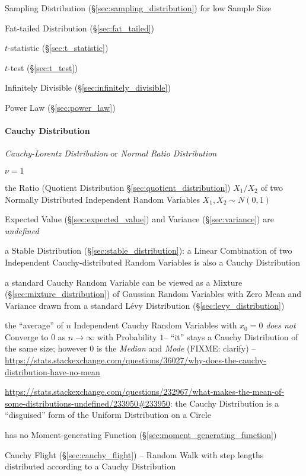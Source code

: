 Sampling Distribution (\S\ref{sec:sampling_distribution}) for low Sample Size

Fat-tailed Distribution (\S\ref{sec:fat_tailed})

$t$-statistic (\S\ref{sec:t_statistic})

$t$-test (\S\ref{sec:t_test})

Infinitely Divisible (\S\ref{sec:infinitely_divisible})

Power Law (\S\ref{sec:power_law})



\paragraph{Cauchy Distribution}\label{sec:cauchy_distribution}\hfill

\emph{Cauchy-Lorentz Distribution} or \emph{Normal Ratio Distribution}

$\nu = 1$

the Ratio (Quotient Distribution \S\ref{sec:quotient_distribution}) $X_1/X_2$ of
two Normally Distributed Independent Random Variables $X_1, X_2 \sim N(0,1)$

Expected Value (\S\ref{sec:expected_value}) and Variance (\S\ref{sec:variance})
are \emph{undefined}

a Stable Distribution (\S\ref{sec:stable_distribution}): a Linear Combination of
two Independent Cauchy-distributed Random Variables is also a Cauchy
Distribution

a standard Cauchy Random Variable can be viewed as a Mixture
(\S\ref{sec:mixture_distribution}) of Gaussian Random Variables with Zero Mean
and Variance drawn from a standard L\'evy Distribution
(\S\ref{sec:levy_distribution})

the ``average'' of $n$ Independent Cauchy Random Variables with $x_0 = 0$
\emph{does not} Converge to $0$ as $n \to \infty$ with Probability $1$-- ``it''
stays a Cauchy Distribution of the same size; however $0$ is the \emph{Median}
and \emph{Mode} (FIXME: clarify)
--\url{https://stats.stackexchange.com/questions/36027/why-does-the-cauchy-distribution-have-no-mean}

\url{https://stats.stackexchange.com/questions/232967/what-makes-the-mean-of-some-distributions-undefined/233950#233950}:
the Cauchy Distribution is a ``disguised'' form of the Uniform Distribution on a
Circle

has no Moment-generating Function (\S\ref{sec:moment_generating_function})

Cauchy Flight (\S\ref{sec:cauchy_flight}) -- Random Walk with step lengths
distributed according to a Cauchy Distribution



